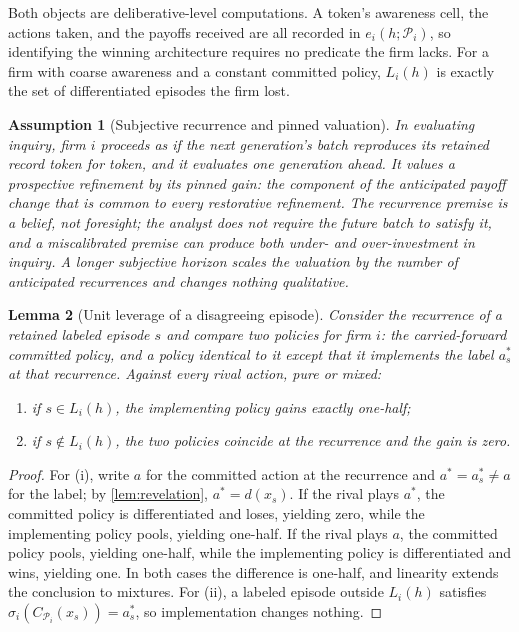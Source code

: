 \documentclass[11pt]{article}
\newtheorem{assumption}{Assumption}[section]
\newtheorem{lemma}[assumption]{Lemma}
\begin{document}
Both objects are deliberative-level computations.  A token's awareness cell,
the actions taken, and the payoffs received are all recorded in
$e_i(h;\mathcal P_i)$, so identifying the winning architecture requires no
predicate the firm lacks.  For a firm with coarse awareness and a constant
committed policy, $L_i(h)$ is exactly the set of differentiated episodes the
firm lost.

\begin{assumption}[Subjective recurrence and pinned valuation]
\label{ass:subjective-recurrence}
In evaluating inquiry, firm $i$ proceeds as if the next generation's batch
reproduces its retained record token for token, and it evaluates one
generation ahead.  It values a prospective refinement by its \emph{pinned
gain}: the component of the anticipated payoff change that is common to every
restorative refinement.  The recurrence premise is a belief, not foresight;
the analyst does not require the future batch to satisfy it, and a
miscalibrated premise can produce both under- and over-investment in inquiry.
A longer subjective horizon scales the valuation by the number of anticipated
recurrences and changes nothing qualitative.
\end{assumption}

\begin{lemma}[Unit leverage of a disagreeing episode]
\label{lem:unit-leverage}
Consider the recurrence of a retained labeled episode $s$ and compare two
policies for firm $i$: the carried-forward committed policy, and a policy
identical to it except that it implements the label $a^*_s$ at that
recurrence.  Against every rival action, pure or mixed:
\begin{enumerate}[label=(\roman*)]
  \item if $s\in L_i(h)$, the implementing policy gains exactly one-half;
  \item if $s\notin L_i(h)$, the two policies coincide at the recurrence and
  the gain is zero.
\end{enumerate}
\end{lemma}

\begin{proof}
For (i), write $a$ for the committed action at the recurrence and
$a^*=a^*_s\neq a$ for the label; by \cref{lem:revelation}, $a^*=d(x_s)$.  If
the rival plays $a^*$, the committed policy is differentiated and loses,
yielding zero, while the implementing policy pools, yielding one-half.  If the
rival plays $a$, the committed policy pools, yielding one-half, while the
implementing policy is differentiated and wins, yielding one.  In both cases
the difference is one-half, and linearity extends the conclusion to mixtures.
For (ii), a labeled episode outside $L_i(h)$ satisfies
$\sigma_i(C_{\mathcal P_i}(x_s))=a^*_s$, so implementation changes nothing.
\end{proof}
\end{document}
